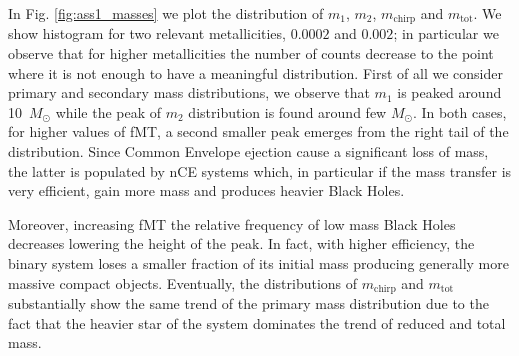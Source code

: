 \documentclass[prb,twocolumn,9pt]{revtex4-1}
\begin{document}
In Fig. \ref{fig:ass1_masses} we plot the distribution of \(m_1\), \(m_2\), \(m_\text{chirp}\) and \(m_\text{tot}\). We show histogram for two relevant metallicities, \(0.0002\) and \(0.002\); in particular we observe that for higher metallicities the number of counts decrease to the point where it is not enough to have a meaningful distribution. 
First of all we consider primary and secondary mass distributions, we observe that \(m_1\) is peaked around \SI{10}{\(M_{\odot}\)} while the peak of \(m_2\) distribution is found around few \(M_{\odot}\). In both cases, for higher values of fMT, a second smaller peak emerges from the right tail of the distribution. 
Since Common Envelope ejection cause a significant loss of mass, the latter is populated by nCE systems which, in particular if the mass transfer is very efficient, gain more mass and produces heavier Black Holes. %

Moreover, increasing fMT the relative frequency of low mass Black Holes decreases lowering the height of the peak. In fact, with higher efficiency, the binary system loses a smaller fraction of its initial mass producing generally more massive compact objects. 
Eventually, the distributions of \(m_\text{chirp}\) and \(m_\text{tot}\) substantially show the same trend of the primary mass distribution due to the fact that the heavier star of the system dominates the trend of reduced and total mass.


\end{document}
